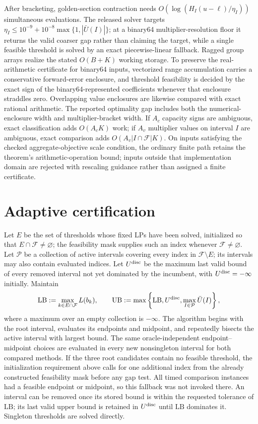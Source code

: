 \documentclass[11pt]{article}
\theoremstyle{plain}
\theoremstyle{definition}
\theoremstyle{remark}
\begin{document}
After bracketing, golden-section contraction needs $O(\log(H_I(u-\ell)/\eta_I))$ simultaneous evaluations.  The released solver targets $\eta_I\le10^{-9}+10^{-8}\max\{1,|\bar U(I)|\}$; at a binary64 multiplier-resolution floor it returns the valid coarser gap rather than claiming the target, while a single feasible threshold is solved by an exact piecewise-linear fallback.  Ragged group arrays realize the stated $O(B+K)$ working storage.  To preserve the real-arithmetic certificate for binary64 inputs, vectorized range accumulation carries a conservative forward-error enclosure, and threshold feasibility is decided by the exact sign of the binary64-represented coefficients whenever that enclosure straddles zero.  Overlapping value enclosures are likewise compared with exact rational arithmetic.  The reported optimality gap includes both the numerical-enclosure width and multiplier-bracket width.  If $A_c$ capacity signs are ambiguous, exact classification adds $O(A_cK)$ work; if $A_v$ multiplier values on interval $I$ are ambiguous, exact comparison adds $O(A_v|I\cap\mathcal F|K)$.  On inputs satisfying the checked aggregate-objective scale condition, the ordinary finite path retains the theorem's arithmetic-operation bound; inputs outside that implementation domain are rejected with rescaling guidance rather than assigned a finite certificate.

\section{Adaptive certification}\label{sec:adaptive}

Let $E$ be the set of thresholds whose fixed LPs have been solved, initialized so that $E\cap\mathcal F\ne\varnothing$; the feasibility mask supplies such an index whenever $\mathcal F\ne\varnothing$.  Let $\mathcal P$ be a collection of active intervals covering every index in $\mathcal F\setminus E$; its intervals may also contain evaluated indices.  Let $U^{\rm disc}$ be the maximum last valid bound of every removed interval not yet dominated by the incumbent, with $U^{\rm disc}=-\infty$ initially.  Maintain
\[
\mathrm{LB}:=\max_{k\in E\cap\mathcal F}L(b_k),
\qquad
\mathrm{UB}:=\max\left\{\mathrm{LB},U^{\rm disc},\max_{I\in\mathcal P}\bar U(I)\right\},
\]
where a maximum over an empty collection is $-\infty$.  The algorithm begins with the root interval, evaluates its endpoints and midpoint, and repeatedly bisects the active interval with largest bound.  The same oracle-independent endpoint--midpoint choices are evaluated in every new nonsingleton interval for both compared methods.  If the three root candidates contain no feasible threshold, the initialization requirement above calls for one additional index from the already constructed feasibility mask before any gap test.  All timed comparison instances had a feasible endpoint or midpoint, so this fallback was not invoked there.  An interval can be removed once its stored bound is within the requested tolerance of $\mathrm{LB}$; its last valid upper bound is retained in $U^{\rm disc}$ until $\mathrm{LB}$ dominates it.  Singleton thresholds are solved directly.
\end{document}
